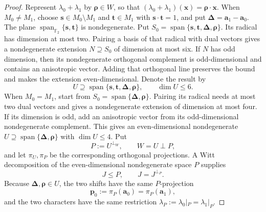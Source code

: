 \documentclass[11pt,letterpaper,onecolumn]{article}
\theoremstyle{plain}
\theoremstyle{definition}
\theoremstyle{remark}
\newcommand{\Ftwo}{\mathbb F_2}
\newcommand{\Span}{\operatorname{span}}
\begin{document}
\begin{proof}
Represent \(\lambda_0+\lambda_1\) by \({\boldsymbol{\rho}}\in W\), so that
\((\lambda_0+\lambda_1)({\mathbf{x}})={\boldsymbol{\rho}}\cdot {\mathbf{x}}\).  When \(M_0\ne M_1\), choose
\({\mathbf{s}}\in M_0\setminus M_1\) and \({\mathbf{t}}\in M_1\) with
\({\mathbf{s}}\cdot {\mathbf{t}}=1\), and put \({\boldsymbol{\Delta}}={\mathbf{a}}_1-{\mathbf{a}}_0\).  The plane
\(\Span_{\Ftwo}\{{\mathbf{s}},{\mathbf{t}}\}\) is nondegenerate.  Put
\(S_0=\Span\{{\mathbf{s}},{\mathbf{t}},{\boldsymbol{\Delta}},{\boldsymbol{\rho}}\}\).  Its radical has dimension at most two.
Pairing a basis of that radical with dual vectors gives a nondegenerate
extension \(N\supseteq S_0\) of dimension at most six.  If \(N\) has odd
dimension, then its nondegenerate orthogonal complement is odd-dimensional
and contains an anisotropic vector. Adding that orthogonal line preserves
the bound and makes the extension even-dimensional.  Denote the result by
\[
 U\supseteq\Span\{{\mathbf{s}},{\mathbf{t}},{\boldsymbol{\Delta}},{\boldsymbol{\rho}}\},
 \qquad \dim U\le6.
\]
When \(M_0=M_1\), start from
\(S_0=\Span\{{\boldsymbol{\Delta}},{\boldsymbol{\rho}}\}\).  Pairing its radical needs at most two dual
vectors and gives a nondegenerate extension of dimension at most four. If
its dimension is odd, add an anisotropic vector from its odd-dimensional
nondegenerate complement.  This gives an even-dimensional nondegenerate
\(U\supseteq\Span\{{\boldsymbol{\Delta}},{\boldsymbol{\rho}}\}\) with \(\dim U\le4\).
Put
\[
 P:=U^{\perp_W},
 \qquad W=U\perp P,
\]
and let \(\pi_U,\pi_P\) be the corresponding orthogonal projections.  A
Witt decomposition of the even-dimensional nondegenerate space \(P\)
supplies
\[
 J\le P,
 \qquad J=J^{\perp_P}.
\]
Because \({\boldsymbol{\Delta}},{\boldsymbol{\rho}}\in U\), the two shifts have the same
\(P\)-projection
\[
 {\mathbf{p}}_0:=\pi_P({\mathbf{a}}_0)=\pi_P({\mathbf{a}}_1),
\]
and the two characters have the same restriction
\(\lambda_P:=\lambda_0|_P=\lambda_1|_P\).


\end{proof}
\end{document}
